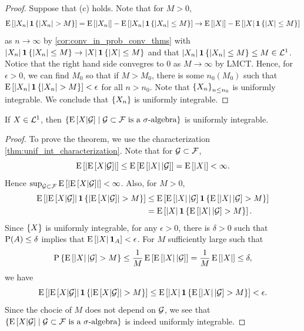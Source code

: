 \begin{proof}
    Suppose that (c) holds. Note that for $M>0$, 
    \begin{equation*}
        \E\sbrc{\abs{X_n}\one\set{\abs{X_n}>M}} = \E\sbrc{\abs{X_n}} - \E\sbrc{\abs{X_n}\one\set{\abs{X_n}\leq M}} 
        \to \E\sbrc{\abs{X}} - \E\sbrc{\abs{X}\one\set{\abs{X}\leq M}}
    \end{equation*}
    as $n\to\infty$ by \cref{cor:conv_in_prob_conv_thms} with $\abs{X_n}\one\set{\abs{X_n}\leq M}\to\abs{X}\one\set{\abs{X}\leq M}$ 
    and that $\abs{X_n}\one\set{\abs{X_n}\leq M}\leq M\in\L^1$. Notice that the right hand side 
    convegres to $0$ as $M\to\infty$ by LMCT. Hence, for $\epsilon>0$, we can find 
    $M_0$ so that if $M>M_0$, there is some $n_0(M_0)$ such that $\E\sbrc{\abs{X_n}\one\set{\abs{X_n}>M}}< \epsilon$ 
    for all $n> n_0$. Note that $\set{X_n}_{n\leq n_0}$ is uniformly integrable. We conclude that 
    $\set{X_n}$ is uniformly integrable. 
\end{proof}

\begin{theorem}\label{thm:cond_exp_unif_int}
    If $X\in\L^1$, then $\Set{\E\sbrc{X|\G}}{\G\subset\F\text{ is a $\sigma$-algebra}}$ is uniformly integrable. 
\end{theorem}
\begin{proof}
    To prove the theorem, we use the characterization \cref{thm:unif_int_characterization}. Note that 
    for $\G\subset\F$, 
    \begin{equation*}
        \E\sbrc{\abs{\E\sbrc{X|\G}}} \leq \E\sbrc{\E\sbrc{\abs{X}|\G}} 
        = \E\sbrc{\abs{X}} < \infty. 
    \end{equation*}
    Hence $\sup_{\G\subset\F}\E\sbrc{\abs{\E\sbrc{X|\G}}}<\infty$. Also, for $M>0$, 
    \begin{equation*}
        \begin{split}
            \E\sbrc{\abs{\E\sbrc{X|\G}}\one\set{\abs{\E\sbrc{X|\G}}>M}} 
            &\leq \E\sbrc{\E\sbrc{\abs{X}|\G}\one\set{\E\sbrc{\abs{X}|\G}>M}} \\
            &= \E\sbrc{\abs{X}\one\set{\E\sbrc{\abs{X}|\G}>M}}.
        \end{split} 
    \end{equation*}
    Since $\set{X}$ is uniformly integrable, for any $\epsilon>0$, there is $\delta>0$ 
    such that $\P(A)\leq \delta$ implies that $\E\sbrc{\abs{X}\one_A}<\epsilon$. 
    For $M$ sufficiently large such that 
    \begin{equation*}
        \P\set{\E\sbrc{\abs{X}|\G}>M}\leq \frac{1}{M}\E\sbrc{\E\sbrc{\abs{X}|\G}} = \frac{1}{M}\E\sbrc{\abs{X}}\leq \delta, 
    \end{equation*}
    we have 
    \begin{equation*}
        \E\sbrc{\abs{\E\sbrc{X|\G}}\one\set{\abs{\E\sbrc{X|\G}}>M}} 
        \leq\E\sbrc{\abs{X}\one\set{\E\sbrc{\abs{X}|\G}>M}}<\epsilon. 
    \end{equation*}
    Since the chocie of $M$ does not depend on $\G$, we see that $\Set{\E\sbrc{X|\G}}{\G\subset\F\text{ is a $\sigma$-algebra}}$ 
    is indeed uniformly integrable. 
\end{proof}

